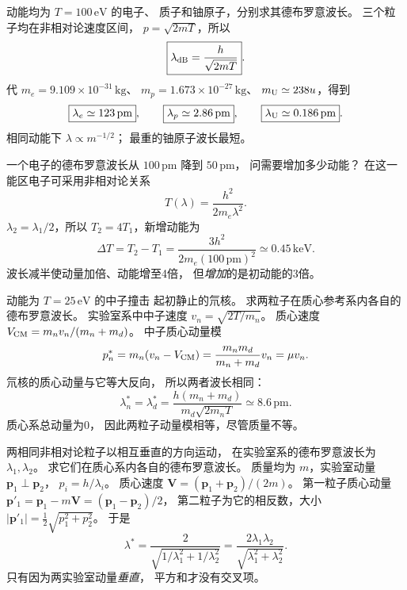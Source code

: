 
动能均为 $T=100\,\mathrm{eV}$ 的电子、
质子和铀原子，分别求其德布罗意波长。
\exsolution
三个粒子均在非相对论速度区间，
$p=\sqrt{2mT}$，所以
\[
 \boxed{\lambda_{\rm dB}=\frac h{\sqrt{2mT}}}.
\]
代
$m_e=9.109\times10^{-31}\,\mathrm{kg}$、
$m_p=1.673\times10^{-27}\,\mathrm{kg}$、
$m_{\rm U}\simeq238u$，得到
\[
 \boxed{\lambda_e\simeq123\,\mathrm{pm}},\qquad
 \boxed{\lambda_p\simeq2.86\,\mathrm{pm}},\qquad
 \boxed{\lambda_{\rm U}\simeq0.186\,\mathrm{pm}}.
\]
\excheck 相同动能下 $\lambda\propto m^{-1/2}$；
最重的铀原子波长最短。

一个电子的德布罗意波长从
$100\,\mathrm{pm}$ 降到 $50\,\mathrm{pm}$，
问需要增加多少动能？
\exsolution
在这一能区电子可采用非相对论关系
\[
 T(\lambda)=\frac{h^2}{2m_e\lambda^2}.
\]
$\lambda_2=\lambda_1/2$，所以
$T_2=4T_1$，新增动能为
\[
 \boxed{\Delta T=T_2-T_1=
 \frac{3h^2}{2m_e(100\,\mathrm{pm})^2}
 \simeq0.45\,\mathrm{keV}}.
\]
\excheck 波长减半使动量加倍、动能增至4倍，
但\emph{增加}的是初动能的3倍。

动能为 $T=25\,\mathrm{eV}$ 的中子撞击
起初静止的氘核。
求两粒子在质心参考系内各自的德布罗意波长。
\exsolution
实验室系中中子速度
$v_n=\sqrt{2T/m_n}$。
质心速度
$V_{\rm CM}=m_nv_n/(m_n+m_d)$。
中子质心动量模
\[
 p_n^*=m_n(v_n-V_{\rm CM})
 =\frac{m_nm_d}{m_n+m_d}v_n=\mu v_n.
\]
氘核的质心动量与它等大反向，
所以两者波长相同：
\[
 \boxed{\lambda_n^*=\lambda_d^*=
 \frac{h(m_n+m_d)}
 {m_d\sqrt{2m_nT}}\simeq8.6\,\mathrm{pm}}.
\]
\excheck 质心系总动量为0，
因此两粒子动量模相等，尽管质量不等。

两相同非相对论粒子以相互垂直的方向运动，
在实验室系的德布罗意波长为
$\lambda_1,\lambda_2$。
求它们在质心系内各自的德布罗意波长。
\exsolution
质量均为 $m$，实验室动量
$\boldsymbol p_1\perp\boldsymbol p_2$，
$p_i=h/\lambda_i$。
质心速度
$\boldsymbol V=(\boldsymbol p_1+\boldsymbol p_2)/(2m)$。
第一粒子质心动量
$\boldsymbol p'_1=\boldsymbol p_1-m\boldsymbol V
=(\boldsymbol p_1-\boldsymbol p_2)/2$，
第二粒子为它的相反数，大小
$|\boldsymbol p'_1|=\tfrac12\sqrt{p_1^2+p_2^2}$。
于是
\[
 \boxed{\lambda^*=
 \frac{2}{\sqrt{1/\lambda_1^2+1/\lambda_2^2}}
 =\frac{2\lambda_1\lambda_2}
 {\sqrt{\lambda_1^2+\lambda_2^2}}}.
\]
\excheck 只有因为两实验室动量\emph{垂直}，
平方和才没有交叉项。

